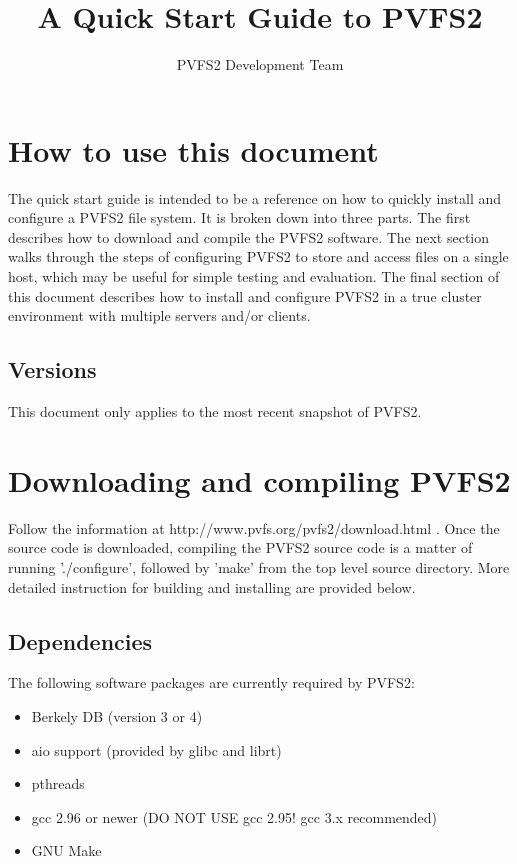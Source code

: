 \documentclass[11pt, letterpaper]{article}
\title{A Quick Start Guide to PVFS2}
\author{ PVFS2 Development Team }
\begin{document}
\maketitle

\tableofcontents

\newpage

\thispagestyle{empty}

\section{How to use this document}
\label{sec:howto}

The quick start guide is intended to be a reference on how to quickly
install and configure a PVFS2 file system.  It is broken down into
three parts.  The first describes how to download and compile the
PVFS2 software.  The next section walks through the steps of
configuring PVFS2 to store and access files on a single host, which
may be useful for simple testing and evaluation.  The final section of
this document describes how to install and configure PVFS2 in a true
cluster environment with multiple servers and/or clients.

\subsection{Versions}

This document only applies to the most recent snapshot of PVFS2.

\section{Downloading and compiling PVFS2}

Follow the information at http://www.pvfs.org/pvfs2/download.html .
Once the source code is downloaded,
compiling the PVFS2 source code is a matter of running './configure',
followed by 'make' from the top level source directory.  More detailed
instruction for building and installing are provided below.

\subsection{Dependencies}

The following software packages are currently required by PVFS2:
\begin{itemize}
\item Berkely DB (version 3 or 4)
\item aio support (provided by glibc and librt)
\item pthreads
\item gcc 2.96 or newer (DO NOT USE gcc 2.95! gcc 3.x recommended)
\item GNU Make
\end{itemize}
\end{document}
